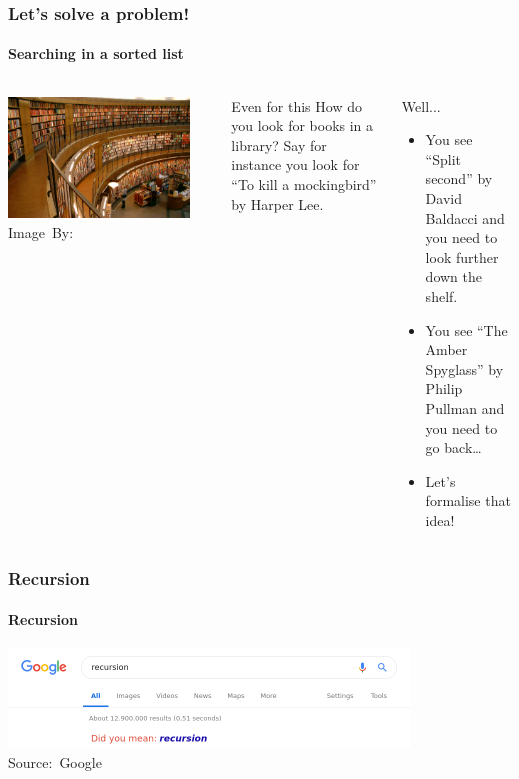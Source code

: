 \begin{frame}
	\frametitle{Let's solve a problem!}
	\framesubtitle{Searching in a sorted list}
	
	\begin{columns}
	\begin{center}
		\includegraphics[width=0.9\textwidth]{images/library.jpg}\\
		\hspace*{15pt}\hbox{\scriptsize Image By:}
	\end{center}
		\begin{block}{Even for this}
			How do you look for books in a library? Say for instance you look for ``To kill a mockingbird'' by Harper Lee.
		\end{block}
		\pause
		\begin{block}{Well...}
			\begin{itemize}
				\item You see ``Split second'' by David Baldacci and you need to look further down the shelf.
					\pause
				\item You see ``The Amber Spyglass'' by Philip Pullman and you need to go back\dots
					\pause
				\item Let's formalise that idea!
			\end{itemize}
		\end{block}
	\end{columns}
\end{frame}

\begin{frame}
	\frametitle{Recursion}
	\framesubtitle{Recursion}
	\begin{center}
		\includegraphics[width=0.8\textwidth]{images/google.png}\\
		\hspace*{15pt}\hbox{\scriptsize Source: Google}
	\end{center}	
\end{frame}

